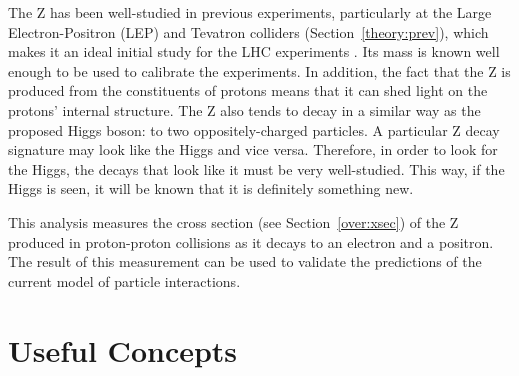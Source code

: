 The Z has been well-studied in previous experiments, 
particularly at the Large Electron-Positron (LEP) 
and Tevatron colliders (Section~\ref{theory:prev}), 
which makes it an ideal initial study for the LHC experiments 
\cite{PhysicsTdr}.  
Its mass is 
known well enough %
to be used to 
calibrate the experiments.  
In addition, the fact that the Z is produced from the 
constituents of protons 
means that it can shed light on the protons' internal structure.   
The Z also tends to decay in a similar way as the 
proposed Higgs boson: 
to two oppositely-charged particles. %
A particular Z decay signature may 
look like the Higgs and vice versa.  
Therefore, in order to look for the Higgs, 
the decays that look like it must be very well-studied.  
This way, if the Higgs is seen, 
it will be known that it is definitely something new.  

This analysis measures the cross section 
(see Section~\ref{over:xsec}) 
of the Z produced in proton-proton collisions 
as it decays to an electron and a positron.  
The result of this measurement 
can be used to validate the predictions 
of the current model of particle interactions.  


\section{Useful Concepts}




